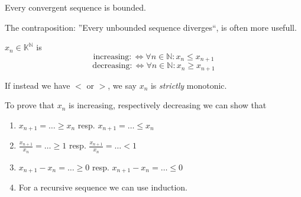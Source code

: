 \begin{theorem}\label{thm:conv_bound}
   Every convergent sequence is bounded.
\end{theorem}
\begin{remark}
   The contraposition: ''Every unbounded sequence diverges``, is often more usefull.
\end{remark}

\begin{definition}
   \(x_n \in \mathbb{K}^\mathbb{N}\) is
   \[\text{increasing} :\iff \forall n \in \mathbb{N}: x_n \leq x_{n+1}\]
   \[\text{decreasing} :\iff \forall n \in \mathbb{N}: x_n \geq x_{n+1}\]
\end{definition}
\begin{remark}[Terminology]
   If instead we have \(<\) or \(>\), we say \(x_n\) is \emph{strictly} monotonic.
\end{remark}
\begin{remark}[Tips]
   To prove that \(x_n\) is increasing, respectively decreasing we can show that
   \begin{enumerate}
      \item \(x_{n+1} = \ldots \geq x_n\) resp. \(x_{n+1} = \ldots \leq x_n\)
      \item \(\frac{x_{n+1}}{x_n} = \ldots \geq 1\) resp. \(\frac{x_{n+1}}{x_n} = \ldots < 1\)
      \item \(x_{n+1} - x_n = \ldots \geq 0\) resp. \(x_{n+1} - x_n = \ldots \leq 0\)
      \item For a recursive sequence we can use induction.
   \end{enumerate}
\end{remark}


